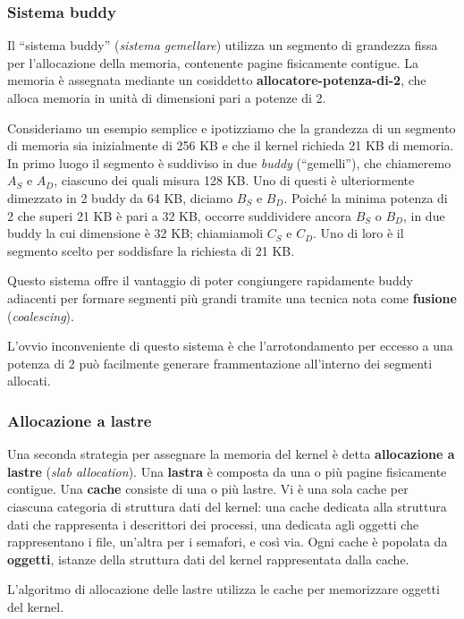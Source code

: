\documentclass[11pt,a4paper]{article}
\begin{document}
{\subsubsection{Sistema buddy}
Il “sistema buddy” (\emph{sistema gemellare}) utilizza un segmento di grandezza fissa per l'allocazio­ne della memoria, contenente pagine fisicamente contigue. La memoria è assegnata me­diante un cosiddetto \textbf{allocatore-potenza-di-2}, che alloca memoria in unità di dimensioni pari a potenze di 2.

Consideriamo un esempio semplice e ipotizziamo che la grandezza di un segmento di
memoria sia inizialmente di 256 KB e che il kernel richieda 21 KB di memoria. In primo
luogo il segmento è suddiviso in due \emph{buddy} (“gemelli”), che chiameremo $A_S$ e $A_D$, ciascuno
dei quali misura 128 KB. Uno di questi è ulteriormente dimezzato in 2 buddy da 64 KB, di­ciamo $B_S$ e $B_D$. Poiché la minima potenza di 2 che superi 21 KB è pari a 32 KB, occorre sud­dividere ancora $B_S$ o $B_D$, in due buddy la cui dimensione è 32 KB; chiamiamoli $C_S$ e
$C_D$. Uno di loro è il segmento scelto per soddisfare la richiesta di 21 KB.

Questo sistema offre il vantaggio di poter congiungere rapidamente buddy adiacenti
per formare segmenti più grandi tramite una tecnica nota come \textbf{fusione} (\emph{coalescing}).

L'ovvio inconveniente di questo sistema è che l'arrotondamento per eccesso a una potenza di 2 può facilmente generare frammentazione all'interno dei segmenti allocati.

\subsubsection{Allocazione a lastre}
Una seconda strategia per assegnare la memoria del kernel è detta \textbf{allocazione a lastre} (\emph{slab
allocation}). Una \textbf{lastra} è composta da una o più pagine fisicamente contigue. Una \textbf{cache}
consiste di una o più lastre. Vi è una sola cache per ciascuna categoria di struttura dati del
kernel: una cache dedicata alla struttura dati che rappresenta i descrittori dei processi, una
dedicata agli oggetti che rappresentano i file, un'altra per i semafori, e così via. Ogni cache è
popolata da \textbf{oggetti}, istanze della struttura dati del kernel rappresentata dalla cache.

L'algoritmo di allocazione delle lastre utilizza le cache per memorizzare oggetti del
kernel.

}
\end{document}
